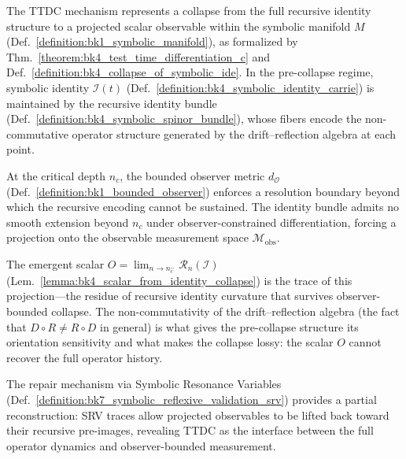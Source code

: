 \begin{scholium}
\label{scholium:bk4_ttdc_symbolic_singularity}
The TTDC mechanism represents a collapse from the full recursive identity structure to a projected scalar observable within the symbolic manifold $M$ (Def.~\ref{definition:bk1_symbolic_manifold}), as formalized by Thm.~\ref{theorem:bk4_test_time_differentiation_c} and Def.~\ref{definition:bk4_collapse_of_symbolic_ide}. In the pre-collapse regime, symbolic identity $\mathcal{I}(t)$ (Def.~\ref{definition:bk4_symbolic_identity_carrie}) is maintained by the recursive identity bundle (Def.~\ref{definition:bk4_symbolic_spinor_bundle}), whose fibers encode the non-commutative operator structure generated by the drift--reflection algebra at each point.

At the critical depth $n_c$, the bounded observer metric $d_{\mathcal{O}}$ (Def.~\ref{definition:bk1_bounded_observer}) enforces a resolution boundary beyond which the recursive encoding cannot be sustained. The identity bundle admits no smooth extension beyond $n_c$ under observer-constrained differentiation, forcing a projection onto the observable measurement space $\mathcal{M}_{\text{obs}}$.

The emergent scalar $O = \lim_{n \to n_c^-} \mathcal{R}_n(\mathcal{I})$ (Lem.~\ref{lemma:bk4_scalar_from_identity_collapse}) is the trace of this projection---the residue of recursive identity curvature that survives observer-bounded collapse. The non-commutativity of the drift--reflection algebra (the fact that $D \circ R \neq R \circ D$ in general) is what gives the pre-collapse structure its orientation sensitivity and what makes the collapse lossy: the scalar $O$ cannot recover the full operator history.

The repair mechanism via Symbolic Resonance Variables (Def.~\ref{definition:bk7_symbolic_reflexive_validation_srv}) provides a partial reconstruction: SRV traces allow projected observables to be lifted back toward their recursive pre-images, revealing TTDC as the interface between the full operator dynamics and observer-bounded measurement.
\end{scholium}

